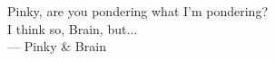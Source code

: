 \thispagestyle{empty}
{}

\vspace*{3cm}

\begin{center}
Pinky, are you pondering what I'm pondering? \\
\smallskip
I think so, Brain, but...
\\ \medskip
    --- Pinky \& Brain
\end{center}